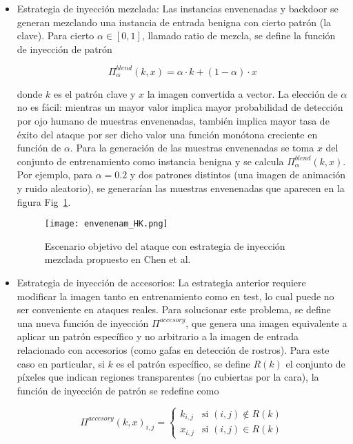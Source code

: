 \begin{itemize}
	\item Estrategia de inyección mezclada: Las instancias envenenadas y backdoor se generan mezclando una instancia de entrada benigna con cierto patrón (la clave). Para cierto $\alpha \in [0,1]$, llamado ratio de mezcla, se define la función de inyección de patrón
	
	$$\Pi_{\alpha}^{blend}(k,x) = \alpha \cdot k + (1-\alpha) \cdot x$$
	
	donde $k$ es el patrón clave y $x$ la imagen convertida a vector. La elección de $\alpha$ no es fácil: mientras un mayor valor implica mayor probabilidad de detección por ojo humano de muestras envenenadas, también implica mayor tasa de éxito del ataque por ser dicho valor una función monótona creciente en función de $\alpha$.
	Para la generación de las muestras envenenadas se toma $x$ del conjunto de entrenamiento como instancia benigna y se calcula $\Pi_{\alpha}^{blend}(k,x)$. Por ejemplo, para $\alpha=0.2$ y dos patrones distintos (una imagen de animación y ruido aleatorio), se generarían las muestras envenenadas que aparecen en la figura Fig~\ref{fig:backdoor2}.
	
	\begin{figure}[h]
    \centering
    \texttt{[image: envenenam\_HK.png]}
    \caption{Escenario objetivo del ataque  con estrategia de inyección mezclada propuesto en Chen et al.~\cite{Backdoor}}
    \label{fig:backdoor2}
\end{figure}

	 \item Estrategia de inyección de accesorios: La estrategia anterior requiere modificar la imagen tanto en entrenamiento como en test, lo cual puede no ser conveniente en ataques reales. Para solucionar este problema, se define una nueva función de inyección $\Pi^{accesory}$, que genera una imagen equivalente a aplicar un patrón específico y no arbitrario a la imagen de entrada relacionado con accesorios (como gafas en detección de rostros).
    Para este caso en particular, si $k$ es el patrón específico, se define $R(k)$ el conjunto de píxeles que indican regiones transparentes (no cubiertas por la cara), la función de inyección de patrón se redefine como 
    
    \[
    \Pi^{accesory}(k,x)_{i,j} = 
    \begin{cases}
        k_{i,j} & \text{si } (i,j) \notin R(k) \\
        x_{i,j} & \text{si } (i,j) \in R(k) 
    \end{cases}
    \]
    

\end{itemize}
